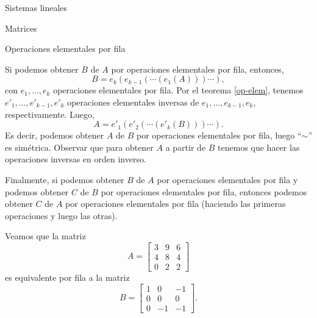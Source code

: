 \begin{chapter}{Sistemas lineales}
\begin{section}{Matrices}
\begin{subsection}{Operaciones elementales por fila}
\begin{obs*}
                    Si podemos obtener $B$ de $A$ por operaciones elementales por fila, entonces, 
                    $$
                    B = e_k(e_{k-1}(\cdots(e_1(A)))\cdots),
                    $$
                    con $e_1,\ldots,e_k$ operaciones elementales por fila. Por el teorema \ref{op-elem},  tenemos $e'_1,\ldots,e'_{k-1},e'_k$ operaciones elementales inversas de  $e_1,\ldots,e_{k-1},e_k$, respectivamente. Luego, 
                    $$
                    A = e'_1(e'_{2}(\cdots(e'_k(B)))\cdots).
                    $$
                    Es decir, podemos  obtener $A$ de $B$ por operaciones elementales por fila, luego ``$\sim$'' es simétrica. Observar que para obtener $A$ a partir de $B$ tenemos que hacer las operaciones inversas en orden inverso. 
                    
                    Finalmente,   si podemos obtener $B$ de $A$ por operaciones elementales por fila y  podemos obtener $C$ de $B$ por operaciones elementales por fila, entonces podemos obtener $C$ de $A$ por operaciones elementales por fila (haciendo las primeras operaciones y luego las otras).
                \end{obs*}
                
                \begin{ejemplo*}
                    Veamos que la matriz 
                    \begin{equation*}
                    A= 	\begin{bmatrix}
                    3 & 9 & 6 \\ 4&8&4 \\ 0&2&2
                    \end{bmatrix}
                    \end{equation*}
                    es equivalente por fila a la matriz
                    \begin{equation*}
                    B = \begin{bmatrix}
                    1&0&-1 \\ 0&0&0\\  0&-1&-1
                    \end{bmatrix}.
                    \end{equation*}
                        \end{ejemplo*}
                    

\end{subsection}
\end{section}
\end{chapter}
